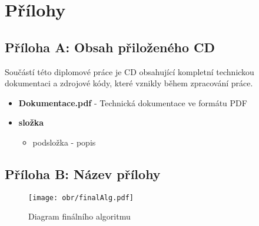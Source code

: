 \documentclass[FM,DP]{tulthesis}
\begin{document}
\chapter*{Přílohy}
\section*{Příloha A: Obsah přiloženého CD}
	\label{appA}
	Součástí této diplomové práce je CD obsahující kompletní technickou dokumentaci a zdrojové kódy, které vznikly během zpracování práce.
	\begin{itemize}
		\setlength\itemsep{1.5em}
		\item \textbf{Dokumentace.pdf} - Technická dokumentace ve formátu PDF
		\item \textbf{složka}
		\begin{itemize}
			\item podsložka - popis
		\end{itemize}
	\end{itemize}
\newpage
{}
\section*{Příloha B: Název přílohy}
	\begin{figure}[!ht]
		\begin{center}
			\texttt{[image: obr/finalAlg.pdf]}
		\end{center}
		\caption{Diagram finálního algoritmu}
		\label{fig:finalAlg}
	\end{figure}
\newpage
\end{document}
